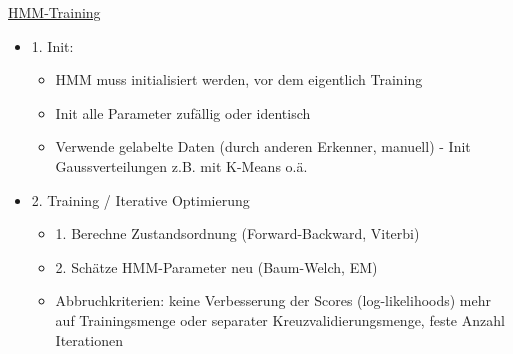 \documentclass[a4paper,10pt,oneside]{article}
\begin{document}
\underline{HMM-Training} \\
 	\begin{itemize}
 		\item 1. Init:	
 			\begin{itemize}
 				\item HMM muss initialisiert werden, vor dem eigentlich Training
 				\item Init alle Parameter zufällig oder identisch
 				\item Verwende gelabelte Daten (durch anderen Erkenner, manuell) - Init Gaussverteilungen z.B. mit K-Means o.ä.
 			\end{itemize}
		\item 2. Training / Iterative Optimierung 
			\begin{itemize}
				\item 1. Berechne Zustandsordnung (Forward-Backward, Viterbi)
				\item 2. Schätze HMM-Parameter neu (Baum-Welch, EM)
				\item Abbruchkriterien: keine Verbesserung der Scores (log-likelihoods) mehr auf Trainingsmenge oder separater Kreuzvalidierungsmenge, feste Anzahl Iterationen
			\end{itemize}
 	\end{itemize}
 	
\end{document}
